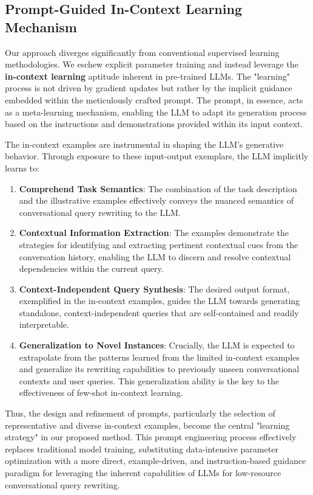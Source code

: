 \subsection{Prompt-Guided In-Context Learning Mechanism}

Our approach diverges significantly from conventional supervised learning methodologies.  We eschew explicit parameter training and instead leverage the \textbf{in-context learning} aptitude inherent in pre-trained LLMs.  The "learning" process is not driven by gradient updates but rather by the implicit guidance embedded within the meticulously crafted prompt.  The prompt, in essence, acts as a meta-learning mechanism, enabling the LLM to adapt its generation process based on the instructions and demonstrations provided within its input context.

The in-context examples are instrumental in shaping the LLM's generative behavior. Through exposure to these input-output exemplars, the LLM implicitly learns to:

\begin{enumerate}
    \item \textbf{Comprehend Task Semantics}: The combination of the task description and the illustrative examples effectively conveys the nuanced semantics of conversational query rewriting to the LLM.
    \item \textbf{Contextual Information Extraction}: The examples demonstrate the strategies for identifying and extracting pertinent contextual cues from the conversation history, enabling the LLM to discern and resolve contextual dependencies within the current query.
    \item \textbf{Context-Independent Query Synthesis}: The desired output format, exemplified in the in-context examples, guides the LLM towards generating standalone, context-independent queries that are self-contained and readily interpretable.
    \item \textbf{Generalization to Novel Instances}:  Crucially, the LLM is expected to extrapolate from the patterns learned from the limited in-context examples and generalize its rewriting capabilities to previously unseen conversational contexts and user queries. This generalization ability is the key to the effectiveness of few-shot in-context learning.
\end{enumerate}

Thus, the design and refinement of prompts, particularly the selection of representative and diverse in-context examples, become the central "learning strategy" in our proposed method. This prompt engineering process effectively replaces traditional model training, substituting data-intensive parameter optimization with a more direct, example-driven, and instruction-based guidance paradigm for leveraging the inherent capabilities of LLMs for low-resource conversational query rewriting.

